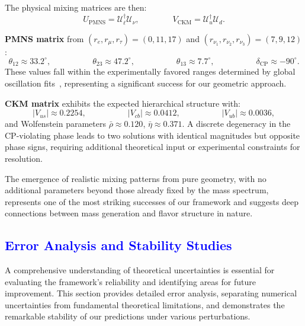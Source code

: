 \documentclass[%
amsmath,amssymb,
aps,
prb,
floatfix, showkeys, 10pt,
]{revtex4-2}
\newcommand{\modif}[1]{\textcolor{blue}{#1}}
\begin{document}
The physical mixing matrices are then:
\begin{equation}
U_{\text{PMNS}} =  \mathcal{U}_\ell^\dagger \mathcal{U}_\nu, \quad  \quad  \quad  \quad 
V_{\text{CKM}}  = \mathcal{U}_u^\dagger \mathcal{U}_d.
\end{equation}

\textbf{PMNS matrix} from $(r_e, r_\mu, r_\tau) = (0, 11, 17)$ and $(r_{\nu_1}, r_{\nu_2}, r_{\nu_3}) = (7, 9, 12)$:
\begin{equation}
\theta_{12} \approx 33.2^{\circ},  \quad  \quad  \quad \quad \quad 
\theta_{23} \approx 47.2^{\circ},  \quad  \quad  \quad  \quad \quad 
\theta_{13} \approx 7.7^{\circ},    \quad  \quad  \quad  \quad \quad 
\delta_{\text{CP}}  \approx -90^{\circ}.
\end{equation}
These values fall within the experimentally favored ranges determined by global oscillation fits~\cite{NuFIT52}, representing a significant success for our geometric approach.

\textbf{CKM matrix} exhibits the expected hierarchical structure with:
\begin{equation}
|V_{us}| \approx 0.2254,  \quad \quad  \quad \quad \quad 
|V_{cb}| \approx 0.0412,  \quad \quad  \quad \quad \quad 
|V_{ub}| \approx 0.0036, 
\end{equation}
and Wolfenstein parameters $\bar{\rho} \approx 0.120$, $\bar{\eta} \approx 0.371$. A discrete degeneracy in the CP-violating phase leads to two solutions with identical magnitudes but opposite phase signs, requiring additional theoretical input or experimental constraints for resolution.

The emergence of realistic mixing patterns from pure geometry, with no additional parameters beyond those already fixed by the mass spectrum, represents one of the most striking successes of our framework and suggests deep connections between mass generation and flavor structure in nature.












{\modif{\section{Error Analysis and Stability Studies}
\label{sec:error_stability} }}
A comprehensive understanding of theoretical uncertainties is essential for evaluating the framework's reliability and identifying areas for future improvement. This section provides detailed error analysis, separating numerical uncertainties from fundamental theoretical limitations, and demonstrates the remarkable stability of our predictions under various perturbations.
\end{document}
